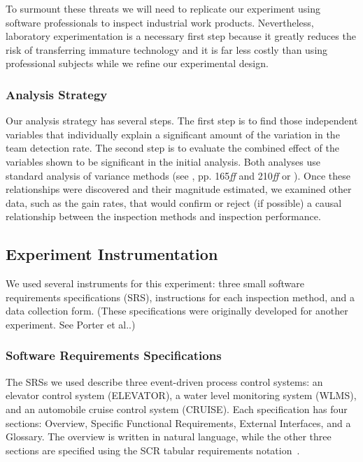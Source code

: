 To surmount these threats we will need to replicate our experiment
using software professionals to inspect industrial work products.
Nevertheless, laboratory experimentation is a necessary first step
because it greatly reduces the risk of transferring immature
technology and it is far less costly than using professional
subjects while we refine our experimental design.

\subsubsection{Analysis Strategy}\label{sec:danalstrat}
\label{analysis}

Our analysis strategy has several steps.
The first step is to find those independent variables 
that individually explain a significant amount
of the variation in the team detection rate.
The second step is to evaluate the combined effect 
of the variables shown to be significant 
in the initial analysis.  Both analyses use 
standard analysis of variance methods 
(see \cite{BHH:Statistics}, pp. {165\it ff} and {210\it ff} or
\cite{Heiberger.1989}).
Once these relationships were discovered and their magnitude
estimated, we examined other data, such as the gain rates,
that would confirm or reject (if possible) a causal relationship 
between the inspection methods and inspection performance. 

%

\subsection{Experiment Instrumentation}  
\label{instruments}
We used several instruments for this experiment: three small
software requirements specifications (SRS), instructions 
for each inspection method, and a data collection form. 
(These specifications were originally developed 
for another experiment. See Porter et al.\cite{PVB.TSE94}.)

\subsubsection{Software Requirements Specifications}
\label{srs}
The SRSs we used describe three event-driven process control 
systems: 
an elevator control system (ELEVATOR), 
a water level monitoring system (WLMS),
and an automobile cruise control system (CRUISE). Each specification has four 
sections:
Overview, Specific Functional Requirements, External Interfaces, and 
a Glossary. The overview is written in  natural language, while 
the other three sections are specified using the SCR
tabular requirements notation~\cite{heninger80}.

